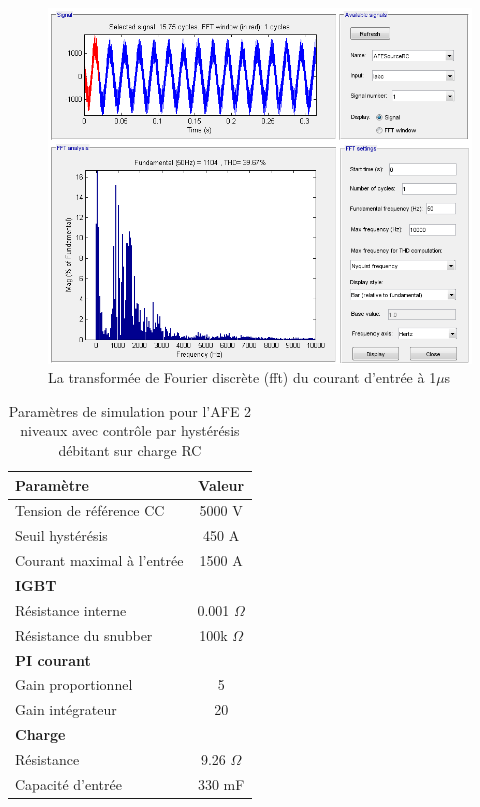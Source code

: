 \begin{figure}[htb]
\centering
\includegraphics[scale=0.5]{fig/AFERC/FFTAnalysisToolResult5u.png}
\caption{La transformée de Fourier discrète (fft) du courant d'entrée à 1$\mu$s}
\label{fft_RC}
\end{figure}


\begin{table}[htb]
\centering
\begin{tabular}{|l|c|} 
  \hline
  \textbf{Paramètre} & \textbf{Valeur}  \\
  \hline\hline
  Tension de référence CC & 5000 V\\ \hline
  Seuil hystérésis & 450 A\\ \hline
  Courant maximal à l'entrée& 1500 A \\ \hline \hline
  \multicolumn{2}{|l|}{\textbf{IGBT}}\\ \hline
  Résistance interne & 0.001 $\Omega$\\
  Résistance du snubber & 100k $\Omega$\\ \hline \hline
   \multicolumn{2}{|l|}{\textbf{PI courant}}\\ \hline
  Gain proportionnel & 5 \\
  Gain intégrateur & 20 \\ \hline \hline
  \multicolumn{2}{|l|}{\textbf{Charge}}\\ \hline
  Résistance & 9.26 $\Omega$ \\
  Capacité d'entrée & 330 mF\\
  \hline
\end{tabular}
\caption{Paramètres de simulation pour l'AFE 2 niveaux avec contrôle par hystérésis débitant sur charge RC}
\label{p_AF_RC}
\end{table}

